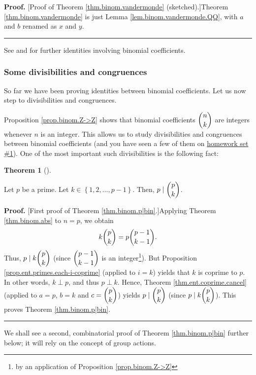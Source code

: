\documentclass[numbers=enddot,12pt,final,onecolumn,notitlepage]{scrartcl}%
\numberwithin{exer}{subsection}
\theoremstyle{definition}
\newtheorem{theo}{Theorem}[subsection]
\newenvironment{theorem}[1][]
{\begin{theo}[#1]\begin{leftbar}}
{\end{leftbar}\end{theo}}
\newenvironment{proof}[1][Proof]{\noindent\textbf{#1.} }{\ \rule{0.5em}{0.5em}}
\newenvironment{noncompile}{}{}
\begin{document}
\begin{proof}
[Proof of Theorem \ref{thm.binom.vandermonde} (sketched).]Theorem
\ref{thm.binom.vandermonde} is just Lemma \ref{lem.binom.vandermonde.QQ}, with
$a$ and $b$ renamed as $x$ and $y$.
\end{proof}

\begin{noncompile}
See \cite{GKP} and \cite{detnotes} for further identities involving binomial coefficients.
\end{noncompile}

\subsubsection{Some divisibilities and congruences}

So far we have been proving identities between binomial coefficients. Let us
now step to divisibilities and congruences.

Proposition \ref{prop.binom.Z->Z} shows that binomial coefficients $\dbinom
{n}{k}$ are integers whenever $n$ is an integer. This allows us to study
divisibilities and congruences between binomial coefficients (and you have
seen a few of them on
\href{http://www-users.math.umn.edu/~dgrinber/19s/hw1s.pdf}{homework set
\#1}). One of the most important such divisibilities is the following fact:

\begin{theorem}
\label{thm.binom.p|bin}Let $p$ be a prime. Let $k\in\left\{  1,2,\ldots
,p-1\right\}  $. Then, $p\mid\dbinom{p}{k}$.
\end{theorem}

\begin{proof}
[First proof of Theorem \ref{thm.binom.p|bin}.]Applying Theorem
\ref{thm.binom.abs} to $n=p$, we obtain%
\[
k\dbinom{p}{k}=p\dbinom{p-1}{k-1}.
\]
Thus, $p\mid k\dbinom{p}{k}$ (since $\dbinom{p-1}{k-1}$ is an
integer\footnote{by an application of Proposition \ref{prop.binom.Z->Z}}). But
Proposition \ref{prop.ent.primes.each-i-coprime} (applied to $i=k$) yields
that $k$ is coprime to $p$. In other words, $k\perp p$, and thus $p\perp k$.
Hence, Theorem \ref{thm.ent.coprime.cancel} (applied to $a=p$, $b=k$ and
$c=\dbinom{p}{k}$) yields $p\mid\dbinom{p}{k}$ (since $p\mid k\dbinom{p}{k}$).
This proves Theorem \ref{thm.binom.p|bin}.
\end{proof}

We shall see a second, combinatorial proof of Theorem \ref{thm.binom.p|bin}
further below; it will rely on the concept of group actions.
\end{document}
